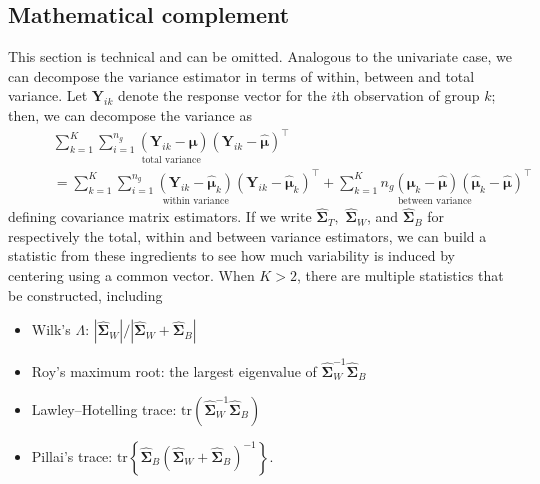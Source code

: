 \documentclass[
  11pt,
  letterpaper,
]{scrbook}
\providecommand{\tightlist}{%
  \setlength{\itemsep}{0pt}\setlength{\parskip}{0pt}}\usepackage{longtable,booktabs,array}
\theoremstyle{definition}
\theoremstyle{remark}
\begin{document}
\hypertarget{mathematical-complement}{%
\subsection{Mathematical complement}\label{mathematical-complement}}

This section is technical and can be omitted. Analogous to the
univariate case, we can decompose the variance estimator in terms of
within, between and total variance. Let \(\boldsymbol{Y}_{ik}\) denote
the response vector for the \(i\)th observation of group \(k\); then, we
can decompose the variance as \begin{align*} &
\underset{\text{total variance}}{\sum_{k=1}^K \sum_{i=1}^{n_g} (\boldsymbol{Y}_{ik} - \widehat{\boldsymbol{\mu}})(\boldsymbol{Y}_{ik} - \widehat{\boldsymbol{\mu}})^\top} \\\qquad &= \underset{\text{within variance}}{\sum_{k=1}^K \sum_{i=1}^{n_g} (\boldsymbol{Y}_{ik} - \widehat{\boldsymbol{\mu}}_k)(\boldsymbol{Y}_{ik} - \widehat{\boldsymbol{\mu}}_k)^\top} + \underset{\text{between variance}}{\sum_{k=1}^K n_g(\boldsymbol{\mu}_{k} - \widehat{\boldsymbol{\mu}})(\widehat{\boldsymbol{\mu}}_k - \widehat{\boldsymbol{\mu}})^\top}
\end{align*} defining covariance matrix estimators. If we write
\(\widehat{\boldsymbol{\Sigma}}_T,\)
\(\widehat{\boldsymbol{\Sigma}}_W\), and
\(\widehat{\boldsymbol{\Sigma}}_B\) for respectively the total, within
and between variance estimators, we can build a statistic from these
ingredients to see how much variability is induced by centering using a
common vector. When \(K>2\), there are multiple statistics that be
constructed, including

\begin{itemize}
\tightlist
\item
  Wilk's \(\Lambda\):
  \(|\widehat{\boldsymbol{\Sigma}}_W|/|\widehat{\boldsymbol{\Sigma}}_W + \widehat{\boldsymbol{\Sigma}}_B|\)
\item
  Roy's maximum root: the largest eigenvalue of
  \(\widehat{\boldsymbol{\Sigma}}_W^{-1}\widehat{\boldsymbol{\Sigma}}_B\)
\item
  Lawley--Hotelling trace:
  \(\mathrm{tr}(\widehat{\boldsymbol{\Sigma}}_W^{-1}\widehat{\boldsymbol{\Sigma}}_B)\)
\item
  Pillai's trace:
  \(\mathrm{tr}\left\{\widehat{\boldsymbol{\Sigma}}_B(\widehat{\boldsymbol{\Sigma}}_W +\widehat{\boldsymbol{\Sigma}}_B)^{-1}\right\}\).
\end{itemize}
\end{document}
